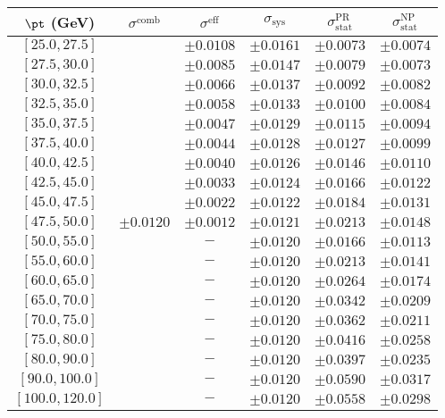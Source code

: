 \begin{tabular}{c||c|c||c|c|c}
$\pt$ (GeV) & $\sigma^{\text{comb}}$ & $\sigma^{\text{eff}}$  & $\sigma_{\text{sys}}$ & $\sigma_{\text{stat}}^{\text{PR}}$  & $\sigma_{\text{stat}}^{\text{NP}}$ \\
\hline
$[25.0, 27.5]$ & \multirow{19}{*}{$\pm0.0120$} & $\pm0.0108$ & $\pm0.0161$ & $\pm0.0073$ & $\pm0.0074$\\
$[27.5, 30.0]$ &  & $\pm0.0085$ & $\pm0.0147$ & $\pm0.0079$ & $\pm0.0073$\\
$[30.0, 32.5]$ &  & $\pm0.0066$ & $\pm0.0137$ & $\pm0.0092$ & $\pm0.0082$\\
$[32.5, 35.0]$ &  & $\pm0.0058$ & $\pm0.0133$ & $\pm0.0100$ & $\pm0.0084$\\
$[35.0, 37.5]$ &  & $\pm0.0047$ & $\pm0.0129$ & $\pm0.0115$ & $\pm0.0094$\\
$[37.5, 40.0]$ &  & $\pm0.0044$ & $\pm0.0128$ & $\pm0.0127$ & $\pm0.0099$\\
$[40.0, 42.5]$ &  & $\pm0.0040$ & $\pm0.0126$ & $\pm0.0146$ & $\pm0.0110$\\
$[42.5, 45.0]$ &  & $\pm0.0033$ & $\pm0.0124$ & $\pm0.0166$ & $\pm0.0122$\\
$[45.0, 47.5]$ &  & $\pm0.0022$ & $\pm0.0122$ & $\pm0.0184$ & $\pm0.0131$\\
$[47.5, 50.0]$ &  & $\pm0.0012$ & $\pm0.0121$ & $\pm0.0213$ & $\pm0.0148$\\
$[50.0, 55.0]$ &  & $-$ & $\pm0.0120$ & $\pm0.0166$ & $\pm0.0113$\\
$[55.0, 60.0]$ &  & $-$ & $\pm0.0120$ & $\pm0.0213$ & $\pm0.0141$\\
$[60.0, 65.0]$ &  & $-$ & $\pm0.0120$ & $\pm0.0264$ & $\pm0.0174$\\
$[65.0, 70.0]$ &  & $-$ & $\pm0.0120$ & $\pm0.0342$ & $\pm0.0209$\\
$[70.0, 75.0]$ &  & $-$ & $\pm0.0120$ & $\pm0.0362$ & $\pm0.0211$\\
$[75.0, 80.0]$ &  & $-$ & $\pm0.0120$ & $\pm0.0416$ & $\pm0.0258$\\
$[80.0, 90.0]$ &  & $-$ & $\pm0.0120$ & $\pm0.0397$ & $\pm0.0235$\\
$[90.0, 100.0]$ &  & $-$ & $\pm0.0120$ & $\pm0.0590$ & $\pm0.0317$\\
$[100.0, 120.0]$ &  & $-$ & $\pm0.0120$ & $\pm0.0558$ & $\pm0.0298$\\
\end{tabular}
